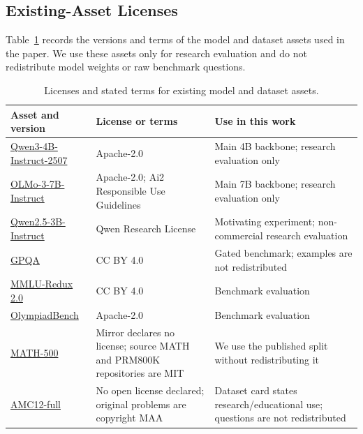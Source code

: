 \documentclass{article}
\begin{document}
\subsection{Existing-Asset Licenses}
\label{app:asset_licenses}

Table~\ref{tab:asset_licenses} records the versions and terms of the model and
dataset assets used in the paper. We use these assets only for research
evaluation and do not redistribute model weights or raw benchmark questions.

\begin{table}[H]
\centering
\caption{Licenses and stated terms for existing model and dataset assets.}
\label{tab:asset_licenses}
\footnotesize
\begin{tabular}{p{}p{}p{}}
\toprule
Asset and version & License or terms & Use in this work \\
\midrule
\href{https://huggingface.co/Qwen/Qwen3-4B-Instruct-2507}{Qwen3-4B-Instruct-2507}
    & Apache-2.0 & Main 4B backbone; research evaluation only \\
\href{https://huggingface.co/allenai/Olmo-3-7B-Instruct}{OLMo-3-7B-Instruct}
    & Apache-2.0; Ai2 Responsible Use Guidelines
    & Main 7B backbone; research evaluation only \\
\href{https://huggingface.co/Qwen/Qwen2.5-3B-Instruct}{Qwen2.5-3B-Instruct}
    & Qwen Research License
    & Motivating experiment; non-commercial research evaluation \\
\href{https://huggingface.co/datasets/Idavidrein/gpqa}{GPQA}
    & CC BY 4.0 & Gated benchmark; examples are not redistributed \\
\href{https://huggingface.co/datasets/edinburgh-dawg/mmlu-redux-2.0}{MMLU-Redux 2.0}
    & CC BY 4.0 & Benchmark evaluation \\
\href{https://huggingface.co/datasets/Hothan/OlympiadBench}{OlympiadBench}
    & Apache-2.0 & Benchmark evaluation \\
\href{https://huggingface.co/datasets/HuggingFaceH4/MATH-500}{MATH-500}
    & Mirror declares no license; source MATH and PRM800K repositories are MIT
    & We use the published split without redistributing it \\
\href{https://huggingface.co/datasets/edev2000/amc12-full}{AMC12-full}
    & No open license declared; original problems are copyright MAA
    & Dataset card states research/educational use; questions are not redistributed \\
\bottomrule
\end{tabular}
\end{table}
\end{document}
